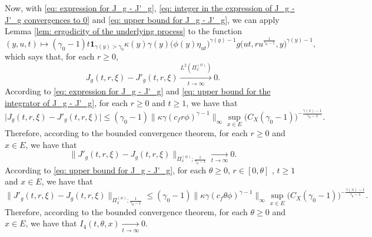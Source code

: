\documentclass[12pt, a4paper]{amsart}
\theoremstyle{definition}
\numberwithin{equation}{section}
\begin{document}
	Now, with \eqref{eq: expression for J_g - J'_g}, \eqref{eq: integer in the expression of J_g - J'_g convergences to 0} and \eqref{eq: upper bound for J_g - J'_g}, we can apply Lemma \ref{lem: ergodicity of the underlying process} to the function
\begin{equation}
	(y,u,t)\mapsto (\gamma_0 - 1)t  \mathbf 1_{\gamma(y)> \gamma_0}  \kappa(y)\gamma(y) \big(   \phi(y) \eta_{ut}   \big)^{\gamma(y) - 1} g \big(ut,ru^{\frac{1}{\gamma_0 - 1}},y \big)^{\gamma(y)-1},
\end{equation}
	which says that, for each $r\geq 0$,
\begin{equation}
	J_g(t,r,\xi) - J'_g(t,r,\xi)
\xrightarrow[t\to \infty]{L^2(\Pi_x^{(\phi)})} 0.
\end{equation}
	According to \eqref{eq: expression for J_g - J'_g} and \eqref{eq: upper bound for the integrator of J_g - J'_g}, for each $r\geq 0$ and $t\geq 1$, we have that
\begin{equation}\label{eq: upper bound for J_g - J'_g}
	\big |	J_g(t,r,\xi) - J'_g(t,r,\xi)  \big |
	\leq (\gamma_0 - 1) \big\| \kappa \gamma (c_f r\phi)^{\gamma - 1}\big\|_\infty \sup_{x\in E} \big( C_X(\gamma_0 - 1) \big)^{-\frac{\gamma(x) - 1}{\gamma_0 - 1}}.
\end{equation}
	Therefore, according to the bounded convergence theorem, for each $r\geq 0$ and $x\in E$, we have that
\begin{equation}
	\big\| J'_g(t,r,\xi) - J_g(t,r,\xi)  \big\|_{\Pi_x^{(\phi)};\frac{1}{\gamma_0 - 1}}
	\xrightarrow[t\to \infty]{} 0.
\end{equation}
	According to \eqref{eq: upper bound for J_g - J'_g}, for each $\theta \geq 0$, $r\in [0,\theta]$ , $t\geq 1$ and $x\in E$, we have that
\begin{equation}
	\big\| J'_g(t,r,\xi) - J_g(t,r,\xi)  \big\|_{\Pi_x^{(\phi)};\frac{1}{\gamma_0 - 1}}
	\leq (\gamma_0 - 1) \big\| \kappa \gamma (c_f \theta \phi)^{\gamma - 1}\big\|_\infty \sup_{x\in E} \big( C_X(\gamma_0 - 1) \big)^{-\frac{\gamma(x) - 1}{\gamma_0 - 1}}.
\end{equation}
	Therefore, according to the bounded convergence theorem, for each $\theta \geq 0$ and $x\in E$, we have that $I_4(t,\theta, x) \xrightarrow[t\to \infty]{} 0$.
	
\end{document}

